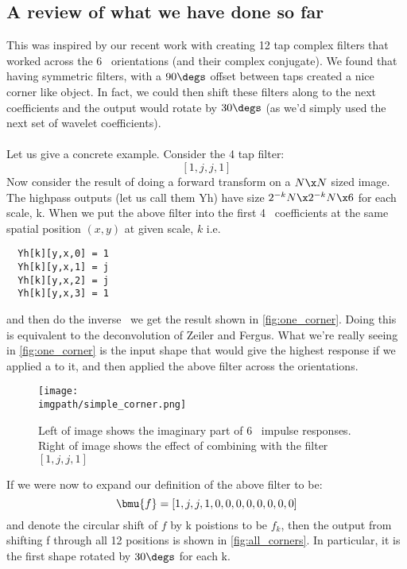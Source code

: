 \subsection*{A review of what we have done so far}
  This was inspired by our recent work with creating 12 tap complex filters
  that worked across the 6 \DTCWT\ orientations (and their complex conjugate).
  We found that having symmetric filters, with a $90\degs$ offset between
  taps created a nice corner like object. In fact, we could then shift these
  filters along to the next coefficients and the output would rotate by
  $30\degs$ (as we'd simply used the next set of wavelet coefficients).\\\\
  Let us give a concrete example. Consider the 4 tap filter:
  $$\left[1, j, j, 1\right]$$
  Now consider the result of doing a forward transform on a $N\x N$ sized
  image. The highpass outputs (let us call them Yh) have size $2^{-k}N \x 2^{-k}N \x 6$ for each
  scale, k.
  When we  put the above filter into the first 4 \DTCWT\ coefficients at
  the same spatial position $(x,y)$ at given scale, $k$ i.e.\
  \begin{lstlisting}
  Yh[k][y,x,0] = 1
  Yh[k][y,x,1] = j
  Yh[k][y,x,2] = j
  Yh[k][y,x,3] = 1
  \end{lstlisting}
  and then do the inverse \DTCWT\, we get the result shown in
  \autoref{fig:one_corner}. Doing this is equivalent to the deconvolution of
  Zeiler and Fergus. What we're really seeing in \autoref{fig:one_corner} is
  the input shape that would give the highest response if we applied a \DTCWT
  to it, and then applied the above filter across the orientations.

  \begin{figure}[!h]
    \centering
    \texttt{[image: \\imgpath/simple\_corner.png]}
    \caption{Left of image shows the imaginary part of 6 \DTCWT\ impulse responses. Right of image
             shows the effect of combining with the filter $\left[1, j, j,
             1\right]$}
    \label{fig:one_corner}
  \end{figure}

  If we were now to expand our definition of the above filter to be:
  $$\bmu{f} = [1, j, j, 1, 0, 0, 0, 0, 0, 0, 0, 0]$$
  and denote the circular shift of $f$ by k poistions to be $f_k$, then the
  output from shifting f through all 12 positions is shown in
  \autoref{fig:all_corners}. In particular, it is the first shape rotated by
  $30\degs$ for each k.

